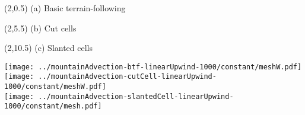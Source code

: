 \documentclass{article}
\begin{document}
\TPMargin{2pt}
\begin{textblock}{4}(2,0.5)
\normalsize
(a) Basic terrain-following
\end{textblock}
\begin{textblock}{2}(2,5.5)
\normalsize
(b) Cut cells
\end{textblock}
\begin{textblock}{2.5}(2,10.5)
\normalsize
(c) Slanted cells
\end{textblock}
\centering
\texttt{[image: ../mountainAdvection-btf-linearUpwind-1000/constant/meshW.pdf]} \\
\texttt{[image: ../mountainAdvection-cutCell-linearUpwind-1000/constant/meshW.pdf]} \\
\hspace*{0.8em}\texttt{[image: ../mountainAdvection-slantedCell-linearUpwind-1000/constant/mesh.pdf]}
\end{document}
